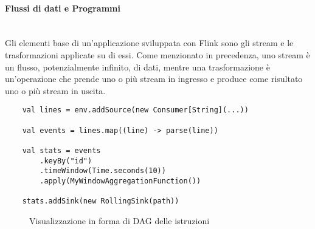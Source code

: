 \paragraph{Flussi di dati e Programmi}  \label{ProgramsDataflows} ~\\

Gli elementi base di un'applicazione sviluppata con Flink sono gli stream e le trasformazioni applicate su di essi. Come menzionato in precedenza, uno stream è un flusso, potenzialmente infinito, di dati, mentre una trasformazione è un'operazione che prende uno o più stream in ingresso e produce come risultato uno o più stream in uscita.

\pagebreak

\begin{verbatim}
    val lines = env.addSource(new Consumer[String](...))
	
    val events = lines.map((line) -> parse(line))
	
    val stats = events
        .keyBy("id")
        .timeWindow(Time.seconds(10))
        .apply(MyWindowAggregationFunction())
		
    stats.addSink(new RollingSink(path))
\end{verbatim}

\begin{figure}[th]
	\centering
	\def\svgwidth{\columnwidth}
	
	\decoRule
	\caption[Streaming Dataflow]{Visualizzazione in forma di DAG delle istruzioni}
	\label{fig:Dataflow}
\end{figure}



